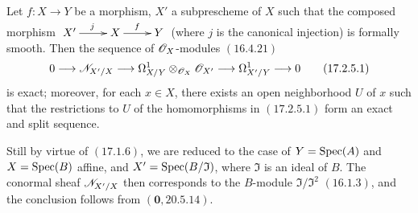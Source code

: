 \begin{proposition}[17.2.5]
\label{IV.17.2.5}
Let $f: X \to Y$ be a morphism, $X'$ a subprescheme of $X$ such that the composed morphism $\xymatrix{X' \ar[r]^{j} & X \ar[r]^{f} & Y}$ (where $j$ is the canonical injection) is formally smooth. Then the sequence of $\mathscr{O}_X$-modules $(\hyperref[IV.16.4.21]{16.4.21})$
\[
\label{IV.17.2.5.1}
0 \to \sh{N}_{X'/X} \to \Omega^1 _{X/Y} \otimes_{\sh{O}_X} \sh{O}_{X'} \to \Omega^1 _{X'/Y} \to 0
\tag{17.2.5.1}
\] is exact; moreover, for each $x \in X$, there exists an open neighborhood $U$ of $x$ such that the restrictions to $U$ of the homomorphisms in $(\hyperref[IV.17.2.5.1]{17.2.5.1})$ form an exact and split sequence.
\end{proposition}
Still by virtue of $(\hyperref[IV.17.1.6]{17.1.6})$, we are reduced to the case of $Y = {\mathop{\mathrm{Spec}}\nolimits}(A)$ and $X = {\mathop{\mathrm{Spec}}\nolimits}(B)$ affine, and $X' = {\mathop{\mathrm{Spec}}\nolimits}(B/\mathfrak{I})$, where $\mathfrak{I}$ is an ideal of $B$. The conormal sheaf $\mathscr{N}_{X'/X}$ then corresponds to the $B$-module $\mathfrak{I}/\mathfrak{I}^2$ $(\hyperref[IV.16.1.3]{16.1.3})$, and the conclusion follows from $(\textbf{0}, \hyperref[0.20.5.14]{20.5.14})$.

